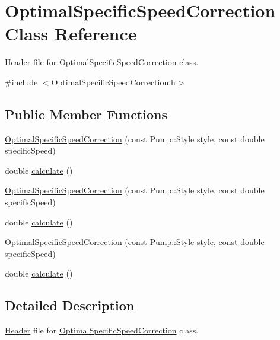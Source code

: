 \hypertarget{class_optimal_specific_speed_correction}{}\section{Optimal\+Specific\+Speed\+Correction Class Reference}
\label{class_optimal_specific_speed_correction}


\hyperlink{class_header}{Header} file for \hyperlink{class_optimal_specific_speed_correction}{Optimal\+Specific\+Speed\+Correction} class.  




{\ttfamily \#include $<$Optimal\+Specific\+Speed\+Correction.\+h$>$}

\subsection*{Public Member Functions}
\begin{DoxyCompactItemize}
\item 
\hyperlink{class_optimal_specific_speed_correction_a8af4972dfd79881d9c9c9b0f47d922b9}{Optimal\+Specific\+Speed\+Correction} (const Pump\+::\+Style style, const double specific\+Speed)
\item 
double \hyperlink{class_optimal_specific_speed_correction_a3337ebde4e64c20f19adbda6204fa0be}{calculate} ()
\item 
\hyperlink{class_optimal_specific_speed_correction_a8af4972dfd79881d9c9c9b0f47d922b9}{Optimal\+Specific\+Speed\+Correction} (const Pump\+::\+Style style, const double specific\+Speed)
\item 
double \hyperlink{class_optimal_specific_speed_correction_a3337ebde4e64c20f19adbda6204fa0be}{calculate} ()
\item 
\hyperlink{class_optimal_specific_speed_correction_a8af4972dfd79881d9c9c9b0f47d922b9}{Optimal\+Specific\+Speed\+Correction} (const Pump\+::\+Style style, const double specific\+Speed)
\item 
double \hyperlink{class_optimal_specific_speed_correction_a3337ebde4e64c20f19adbda6204fa0be}{calculate} ()
\end{DoxyCompactItemize}


\subsection{Detailed Description}
\hyperlink{class_header}{Header} file for \hyperlink{class_optimal_specific_speed_correction}{Optimal\+Specific\+Speed\+Correction} class. 


